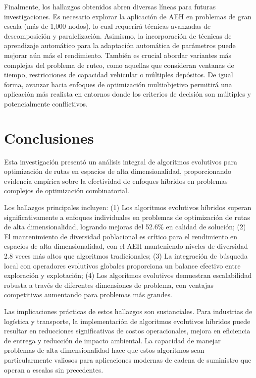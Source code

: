 \documentclass[10pt,a4paper]{article}
\begin{document}
Finalmente, los hallazgos obtenidos abren diversas líneas para futuras investigaciones. Es necesario explorar la aplicación de AEH en problemas de gran escala (más de 1,000 nodos), lo cual requerirá técnicas avanzadas de descomposición y paralelización. Asimismo, la incorporación de técnicas de aprendizaje automático para la adaptación automática de parámetros puede mejorar aún más el rendimiento. También es crucial abordar variantes más complejas del problema de ruteo, como aquellas que consideran ventanas de tiempo, restricciones de capacidad vehicular o múltiples depósitos. De igual forma, avanzar hacia enfoques de optimización multiobjetivo permitirá una aplicación más realista en entornos donde los criterios de decisión son múltiples y potencialmente conflictivos.




\section{Conclusiones}

Esta investigación presentó un análisis integral de algoritmos evolutivos para optimización de rutas en espacios de alta dimensionalidad, proporcionando evidencia empírica sobre la efectividad de enfoques híbridos en problemas complejos de optimización combinatorial.

Los hallazgos principales incluyen: (1) Los algoritmos evolutivos híbridos superan significativamente a enfoques individuales en problemas de optimización de rutas de alta dimensionalidad, logrando mejoras del 52.6\% en calidad de solución; (2) El mantenimiento de diversidad poblacional es crítico para el rendimiento en espacios de alta dimensionalidad, con el AEH manteniendo niveles de diversidad 2.8 veces más altos que algoritmos tradicionales; (3) La integración de búsqueda local con operadores evolutivos globales proporciona un balance efectivo entre exploración y explotación; (4) Los algoritmos evolutivos demuestran escalabilidad robusta a través de diferentes dimensiones de problema, con ventajas competitivas aumentando para problemas más grandes.

Las implicaciones prácticas de estos hallazgos son sustanciales. Para industrias de logística y transporte, la implementación de algoritmos evolutivos híbridos puede resultar en reducciones significativas de costos operacionales, mejora en eficiencia de entrega y reducción de impacto ambiental. La capacidad de manejar problemas de alta dimensionalidad hace que estos algoritmos sean particularmente valiosos para aplicaciones modernas de cadena de suministro que operan a escalas sin precedentes.
\end{document}
